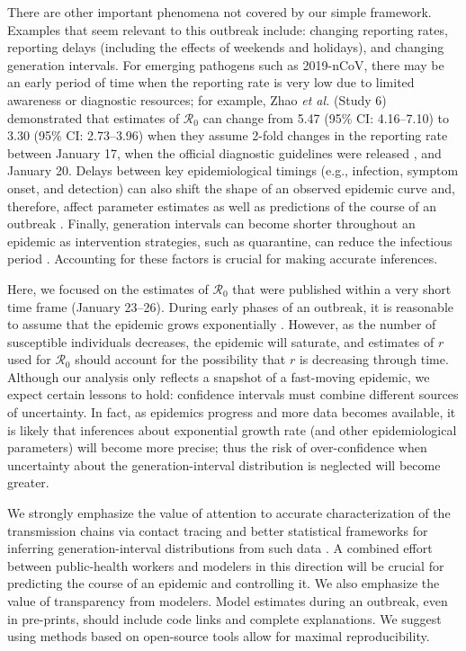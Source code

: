 \documentclass[12pt]{article}
\newcommand{\Ro}{\ensuremath{{\mathcal R}_{0}}\xspace}
\begin{document}
There are other important phenomena not covered by our simple framework. 
Examples that seem relevant to this outbreak include: changing reporting rates, reporting delays (including the effects of weekends and holidays), and changing generation intervals.
For emerging pathogens such as 2019-nCoV, there may be an early period of time when the reporting rate is very low due to limited awareness or diagnostic resources;
for example, Zhao \textit{et al.} \cite{zhaoncov} (Study 6) demonstrated that estimates of \Ro can change from 5.47 (95\% CI: 4.16--7.10) to 3.30 (95\% CI: 2.73--3.96) when they assume 2-fold changes in the reporting rate between January 17, when the official diagnostic guidelines were released \cite{who17protocol}, and January 20.
Delays between key epidemiological timings (e.g., infection, symptom onset, and detection) can also shift the shape of an observed epidemic curve and, therefore, affect parameter estimates as well as predictions of the course of an outbreak \cite{tariq2019assessing}.
Finally, generation intervals can become shorter throughout an epidemic as intervention strategies, such as quarantine, can reduce the infectious period \cite{hethcote2002effects}.
Accounting for these factors is crucial for making accurate inferences.

Here, we focused on the estimates of \Ro that were published within a very short time frame (January 23--26).
During early phases of an outbreak, it is reasonable to assume that the epidemic grows exponentially \cite{anderson1991infectious}. However, as the number of susceptible individuals decreases, the epidemic will saturate, and estimates of $r$ used for \Ro should account for the possibility that $r$ is decreasing through time.
Although our analysis only reflects a snapshot of a fast-moving epidemic, we expect certain lessons to hold: confidence intervals must combine different sources of uncertainty. 
In fact, as epidemics progress and more data becomes available, it is likely that inferences about exponential growth rate (and other epidemiological parameters) will become more precise; thus the risk of over-confidence when uncertainty about the generation-interval distribution is neglected will become greater.

We strongly emphasize the value of attention to accurate characterization of the transmission chains via contact tracing and better statistical frameworks for inferring generation-interval distributions from such data \cite{britton2019estimation}.
A combined effort between public-health workers and modelers in this direction will be crucial for predicting the course of an epidemic and controlling it.
We also emphasize the value of transparency from modelers.
Model estimates during an outbreak, even in pre-prints, should include code links and complete explanations.
We suggest using methods based on open-source tools allow for maximal reproducibility.
\end{document}
